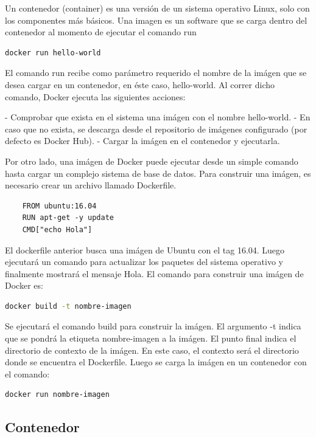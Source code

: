 Un contenedor (container) es una versión de un sistema operativo Linux, solo con los componentes más básicos. Una imagen es un software que se carga dentro del contenedor al momento de ejecutar el comando run

\begin{lstlisting}[language=bash]
    docker run hello-world
\end{lstlisting}


El comando run recibe como parámetro requerido el nombre de la imágen que se desea cargar en un contenedor, en éste caso, hello-world.
Al correr dicho comando, Docker ejecuta las siguientes acciones:

- Comprobar que exista en el sistema una imágen con el nombre hello-world.
- En caso que no exista, se descarga desde el repositorio de imágenes configurado (por defecto es Docker Hub).
- Cargar la imágen en el contenedor y ejecutarla.

Por otro lado, una imágen de Docker puede ejecutar desde un simple comando hasta cargar un complejo sistema de base de datos.
Para construir una imágen, es necesario crear un archivo llamado Dockerfile.

\begin{lstlisting}
    FROM ubuntu:16.04
    RUN apt-get -y update
    CMD["echo Hola"]
\end{lstlisting}

El dockerfile anterior busca una imágen de Ubuntu con el tag 16.04. Luego ejecutará un comando para actualizar los paquetes del sistema operativo y finalmente mostrará el mensaje Hola.
El comando para construir una imágen de Docker es:

\begin{lstlisting}[language=bash]
    docker build -t nombre-imagen
\end{lstlisting}

Se ejecutará el comando build para construir la imágen. El argumento -t indica que se pondrá la etiqueta nombre-imagen a la imágen. El punto final indica el directorio de contexto de la imágen. En este caso, el contexto será el directorio donde se encuentra el Dockerfile.
Luego se carga la imágen en un contenedor con el comando:

\begin{lstlisting}[language=bash]
    docker run nombre-imagen
\end{lstlisting}


\subsection[Contenedor]{Contenedor}


